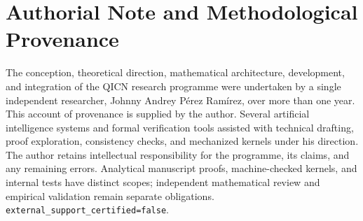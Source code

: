 \documentclass[11pt,a4paper,openany]{book}
\begin{document}
\section*{Authorial Note and Methodological Provenance}
The conception, theoretical direction, mathematical architecture, development,
and integration of the QICN research programme were undertaken by a single
independent researcher, Johnny Andrey P\'erez Ram\'irez, over more than one year.
This account of provenance is supplied by the author. Several artificial
intelligence systems and formal verification tools assisted with technical
drafting, proof exploration, consistency checks, and mechanized kernels under
his direction. The author retains intellectual responsibility for the
programme, its claims, and any remaining errors. Analytical manuscript proofs,
machine-checked kernels, and internal tests have distinct scopes; independent
mathematical review and empirical validation remain separate obligations.
\texttt{external\_support\_certified=false}.
\end{document}
